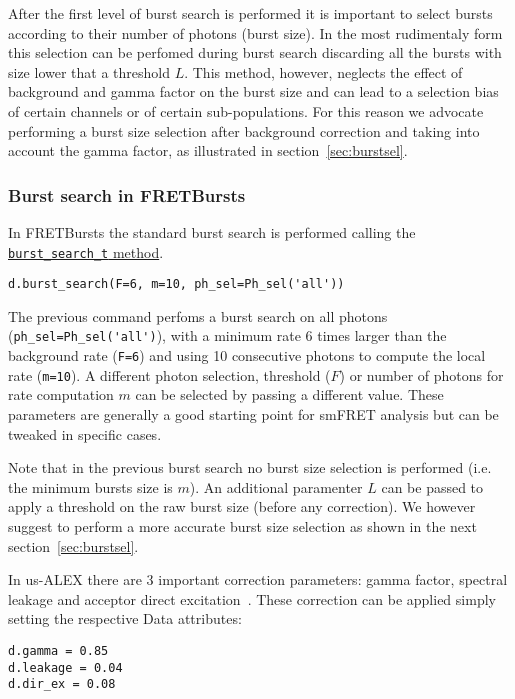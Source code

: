After the first level of burst search is performed it is important to select bursts according to their number of photons (burst size). In the most rudimentaly form this selection can be perfomed during burst search discarding all the bursts
with size lower that a threshold $L$. This method, however, neglects the effect of background and gamma factor on the burst size and can lead to a selection bias of certain channels or of certain sub-populations. 
For this reason we advocate performing a burst size selection after background correction and taking into account the gamma factor, as illustrated in section~\ref{sec:burstsel}.

\subsubsection{Burst search in FRETBursts}
\label{sec:burstsearch_code}

In FRETBursts the standard burst search is performed calling the \href{http://fretbursts.readthedocs.org/en/latest/data_class.html#fretbursts.burstlib.Data.burst_search_t}{\verb|burst_search_t| method}.

\begin{verbatim}
d.burst_search(F=6, m=10, ph_sel=Ph_sel('all'))
\end{verbatim}

The previous command perfoms a burst search on all photons (\verb|ph_sel=Ph_sel('all')|), with a minimum rate 6 times larger than the background rate (\verb|F=6|) and using 10 consecutive photons to compute the local rate (\verb|m=10|).
A different photon selection, threshold ($F$) or number of photons for rate computation $m$ can be selected by passing a different value. These parameters are generally a good starting point for smFRET analysis but can be tweaked in specific cases.

Note that in the previous burst search no burst size selection is performed (i.e. the minimum bursts size is $m$). 
An additional paramenter $L$ can be passed to apply a threshold on the raw burst size (before any correction). 
We however suggest to perform a more accurate burst size selection as shown in the next section~\ref{sec:burstsel}.

In us-ALEX there are 3 important correction parameters: gamma factor, spectral leakage and 
acceptor direct excitation~\cite{Lee_2005}. These correction can be applied simply setting the respective
Data attributes:

\begin{verbatim}
d.gamma = 0.85
d.leakage = 0.04
d.dir_ex = 0.08
\end{verbatim}

